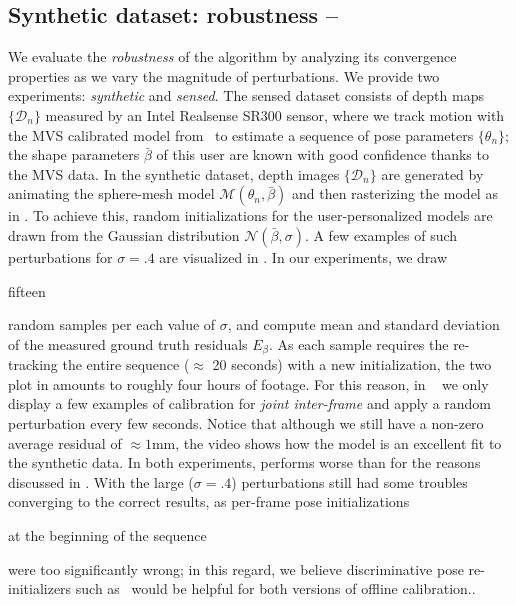 \subsection{Synthetic dataset: robustness -- }
\label{sec:evalsynth}
We evaluate the \emph{robustness} of the algorithm by analyzing its convergence properties as we vary the magnitude of perturbations.
We provide two experiments: \emph{synthetic} and \emph{sensed}. The sensed dataset consists of depth maps $\{\mathcal{D}_n\}$ measured by an Intel Realsense SR300 sensor, where we track motion with the MVS calibrated model from~\cite{tkach2016sphere} to estimate a sequence of pose parameters $\{ \theta_n \}$; the shape parameters $\bar\beta$ of this user are known with good confidence thanks to the MVS data. In the synthetic dataset, depth images $\{\mathcal{D}_n\}$ are generated by animating the sphere-mesh model $\mathcal{M}(\theta_n, \bar\beta)$ and then rasterizing the model as in .
To achieve this, random initializations for the user-personalized models are drawn from the Gaussian distribution {\small $\mathcal{N}(\bar\beta, \sigma)$}. A few examples of such perturbations for $\sigma=.4$ are visualized in .
In our experiments, we draw \begin{edit} fifteen \end{edit} random samples per each value of $\sigma$, and compute mean and standard deviation of the measured ground truth residuals $E_\beta$. 
As each sample requires the re-tracking the entire sequence ($\approx$ 20 seconds) with a new initialization, the two plot in  amounts to roughly four hours of footage. For this reason, in ~\VideoSynth{} we only display a few examples of calibration for \emph{joint inter-frame} and apply a random perturbation every few seconds.
Notice that although we still have a non-zero average residual of $\approx 1$mm, the video shows how the model is an excellent fit to the synthetic data.  
In both experiments, \OfflineHard{} performs worse than \OfflineSoft{} for the reasons discussed in . With the large ($\sigma=.4$) perturbations \OfflineSoft{} still had some troubles converging to the correct results, as per-frame pose initializations \begin{edit}at the beginning of the sequence \end{edit} were too significantly wrong; in this regard, we believe discriminative pose re-initializers such as~\cite{oberweger2015hands} would be helpful for both versions of offline calibration..
